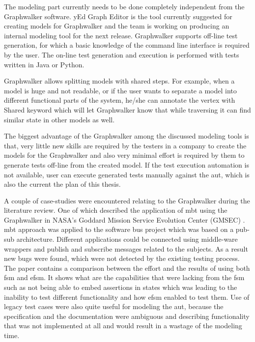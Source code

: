 \par
The modeling part currently needs to be done completely independent from the Graphwalker software. yEd Graph Editor \cite{yEd} is the tool currently suggested for creating models for Graphwalker and the team is working on producing an internal modeling tool for the next release. Graphwalker supports off-line test generation, for which a basic knowledge of the command line interface is required by the user. The on-line test generation and execution is performed with tests written in Java or Python. 

\par
Graphwalker allows splitting models with shared steps. For example, when a model is huge and not readable, or if the user wants to separate a model into different functional parts of the system, he/she can annotate the vertex with Shared keyword which will let Graphwalker know that while traversing it can find similar state in other models as well.

\par
The biggest advantage of the Graphwalker among the discussed modeling tools is that, very little new skills are required by the testers in a company to create the models for the Graphwalker and also very minimal effort is required by them to generate tests off-line from the created model. If the test execution automation is not available, user can execute generated tests manually against the \acrshort{aut}, which is also the current the plan of this thesis.

\par
A couple of case-studies were encountered relating to the Graphwalker during the literature review. One of which described the application of \acrshort{mbt} using the Graphwalker in NASA's Goddard Mission Service Evolution Center (GMSEC) \cite{GMSEC}. \acrshort{mbt} approach was applied to the software bus project which was based on a pub-sub architecture. Different applications could be connected using middle-ware wrappers and publish and subscribe messages related to the subjects. As a result new bugs were found, which were not detected by the existing testing process. The paper contains a comparison between the effort and the results of using both \acrshort{fsm} and \acrshort{efsm}. It shows what are the capabilities that were lacking from the \acrshort{fsm} such as not being able to embed assertions in states which was leading to the inability to test different functionality and how \acrshort{efsm} enabled to test them. Use of legacy test cases were also quite useful for modeling the \acrshort{aut}, because the specification and the documentation were ambiguous and describing functionality that was not implemented at all and would result in a wastage of the modeling time.

